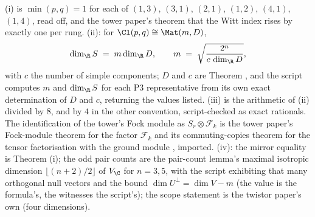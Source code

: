 (i) is $\min(p,q) = 1$ for each of $(1,3)$, $(3,1)$, $(2,1)$, $(1,2)$, $(4,1)$, $(1,4)$, read off, and the tower paper's theorem that the Witt index rises by exactly one per rung. (ii): for $\Cl(p,q) \cong \Mat(m, D)$,
\[
\dim_{\R} S \;=\; m \dim_{\R} D, \qquad m \;=\; \sqrt{\frac{2^{n}}{c\,\dim_{\R} D}},
\]
with $c$ the number of simple components; $D$ and $c$ are Theorem , and the script computes $m$ and $\dim_{\R} S$ for each P3 representative from its own exact determination of $D$ and $c$, returning the values listed. (iii) is the arithmetic of (ii) divided by $8$, and by $4$ in the other convention, script-checked as exact rationals. The identification of the tower's Fock module as $S_{r} \otimes \mathcal{F}_{k}$ is the tower paper's Fock-module theorem for the factor $\mathcal{F}_{k}$ and its commuting-copies theorem for the tensor factorisation with the ground module \cite[Thms.~4.2 and 3.2]{ButlerT3}, imported. (iv): the mirror equality is Theorem (i); the odd pair counts are the pair-count lemma's maximal isotropic dimension $\lfloor (n+2)/2 \rfloor$ of $V_{\C}$ for $n = 3, 5$, with the script exhibiting that many orthogonal null vectors and the bound $\dim U^{\perp} = \dim V - m$ (the value is the formula's, the witnesses the script's); the scope statement is the twistor paper's own (four dimensions).
